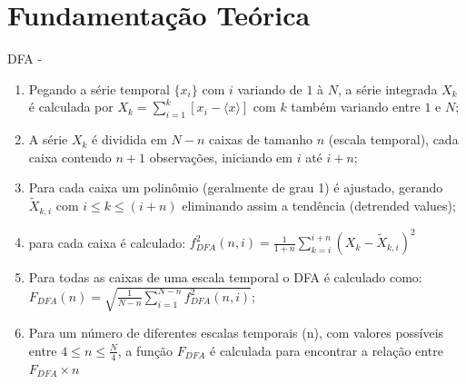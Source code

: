 \documentclass[11pt, aspectratio=169]{beamer}
\begin{document}
\section{Fundamentação Teórica}


\begin{frame}{DFA - \cite{Peng_1994}}


  \begin{enumerate}
    \label{list:dfa}
    \item Pegando a série temporal \(\{x_{i}\}\) com  \(i\) variando de  \(1\) à \(N\), a série integrada \(X_{k}\) é calculada por \(X_{k} = \sum_{i=1}^{k}\left[x_{i} - \langle x \rangle \right] \) com \(k\) também variando entre \(1\) e \(N\);
    \item A série  \(X_{k}\) é dividida em \(N - n\) caixas de tamanho \(n\) (escala temporal), cada caixa contendo \(n + 1\) observações, iniciando em \(i\) até \(i + n\);
    \item Para cada caixa um polinômio (geralmente de grau 1) é ajustado, gerando \(\widetilde{X}_{k, i}\) com \( i \le k \le (i + n) \) eliminando assim a tendência (detrended values);
    \item  para cada caixa é calculado: \(f_{DFA}^{2}(n, i) = \frac{1}{1+n} \sum_{k=i}^{i + n}(X_{k}-\widetilde{X}_{k, i})^{2}\)
    \item Para todas as caixas de uma escala temporal o DFA é calculado como: \(F_{DFA}(n) = \sqrt{\frac{1}{N - n} \sum_{i=1}^{N-n} f_{DFA}^{2}(n, i)}\);
    \item Para um número de diferentes escalas temporais (n), com valores possíveis entre \( 4 \le n \le \frac{N}{4}\), a função \(F_{DFA}\) é calculada para encontrar a relação entre \(F_{DFA} \times n\)
  \end{enumerate}


\end{frame}
\end{document}
